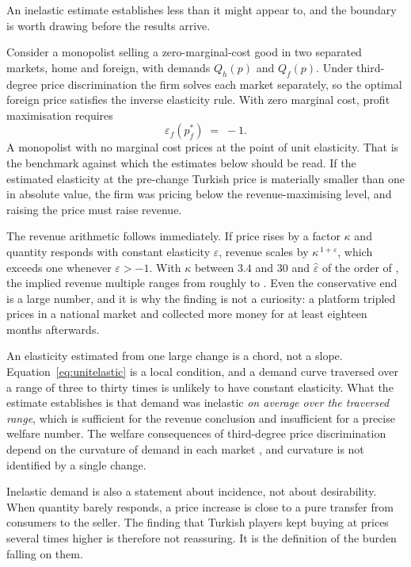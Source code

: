 \documentclass[11pt]{article}
\begin{document}
An inelastic estimate establishes less than it might appear to, and the boundary is worth drawing
before the results arrive.

Consider a monopolist selling a zero-marginal-cost good in two separated markets, home and
foreign, with demands $Q_h(p)$ and $Q_f(p)$. Under third-degree price discrimination the firm
solves each market separately, so the optimal foreign price satisfies the inverse elasticity rule.
With zero marginal cost, profit maximisation requires
\begin{equation}
\varepsilon_f\!\left(p_f^{*}\right) \;=\; -1 .
\label{eq:unitelastic}
\end{equation}
A monopolist with no marginal cost prices at the point of unit elasticity. That is the benchmark against which the estimates below should be read. If the estimated elasticity at the pre-change Turkish price is
materially smaller than one in absolute value, the firm was pricing below the revenue-maximising
level, and raising the price must raise revenue.

The revenue arithmetic follows immediately. If price rises by a factor $\kappa$ and quantity
responds with constant elasticity $\varepsilon$, revenue scales by $\kappa^{\,1+\varepsilon}$,
which exceeds one whenever $\varepsilon > -1$. With $\kappa$ between $3.4$ and $30$ and
$\hat\varepsilon$ of the order of \epsUnitsHi, the implied revenue multiple ranges from roughly
\revMultLo{} to \revMultHi. Even the conservative end is a large number, and it is why the finding is not a curiosity:
a platform tripled prices in a national market and collected more money for at least eighteen
months afterwards.

An elasticity estimated from one large change is a chord, not a slope.
Equation~\eqref{eq:unitelastic} is a local condition, and a demand curve traversed over a range of
three to thirty times is unlikely to have constant elasticity. What the estimate establishes is
that demand was inelastic \emph{on average over the traversed range}, which is sufficient for the
revenue conclusion and insufficient for a precise welfare number. The welfare consequences of
third-degree price discrimination depend on the curvature of demand in each market
\citep{schmalensee1981,varian1985,aguirre2010}, and curvature is not identified by a single change.

Inelastic demand is also a statement about incidence, not about desirability. When quantity
barely responds, a price increase is close to a pure transfer from consumers to the seller. The
finding that Turkish players kept buying at prices several times higher is therefore not
reassuring. It is the definition of the burden falling on them.
\end{document}
